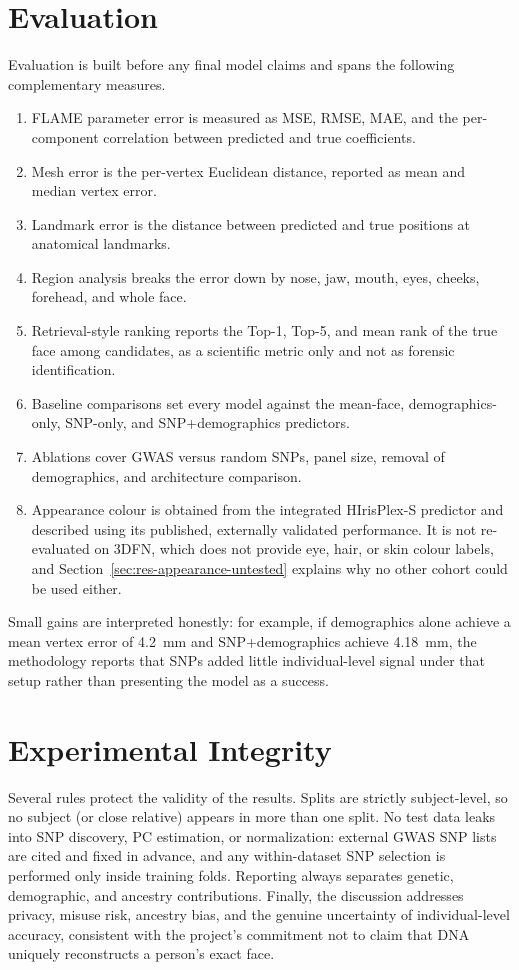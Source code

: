\section{Evaluation}
Evaluation is built before any final model claims and spans the following complementary measures.
\begin{enumerate}
\item FLAME parameter error is measured as MSE, RMSE, MAE, and the per-component correlation between predicted and true coefficients.
\item Mesh error is the per-vertex Euclidean distance, reported as mean and median vertex error.
\item Landmark error is the distance between predicted and true positions at anatomical landmarks.
\item Region analysis breaks the error down by nose, jaw, mouth, eyes, cheeks, forehead, and whole face.
\item Retrieval-style ranking reports the Top-1, Top-5, and mean rank of the true face among candidates, as a scientific metric only and not as forensic identification.
\item Baseline comparisons set every model against the mean-face, demographics-only, SNP-only, and SNP+demographics predictors.
\item Ablations cover GWAS versus random SNPs, panel size, removal of demographics, and architecture comparison.
\item Appearance colour is obtained from the integrated HIrisPlex-S predictor and described using its published, externally validated performance. It is not re-evaluated on 3DFN, which does not provide eye, hair, or skin colour labels, and Section~\ref{sec:res-appearance-untested} explains why no other cohort could be used either.
\end{enumerate}
Small gains are interpreted honestly: for example, if demographics alone achieve a mean vertex error of 4.2~mm and SNP+demographics achieve 4.18~mm, the methodology reports that SNPs added little individual-level signal under that setup rather than presenting the model as a success.

\section{Experimental Integrity}
Several rules protect the validity of the results. Splits are strictly subject-level, so no subject (or close relative) appears in more than one split. No test data leaks into SNP discovery, PC estimation, or normalization: external GWAS SNP lists are cited and fixed in advance, and any within-dataset SNP selection is performed only inside training folds. Reporting always separates genetic, demographic, and ancestry contributions. Finally, the discussion addresses privacy, misuse risk, ancestry bias, and the genuine uncertainty of individual-level accuracy, consistent with the project's commitment not to claim that DNA uniquely reconstructs a person's exact face.

